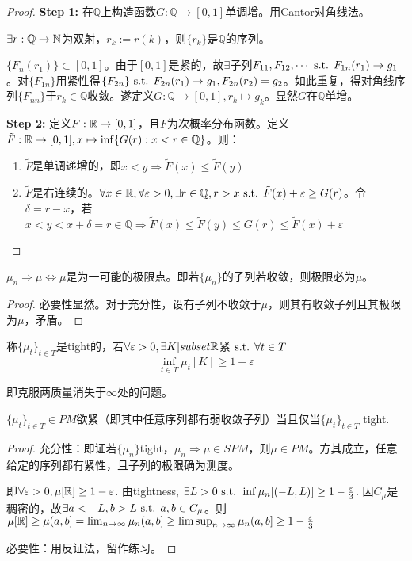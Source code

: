 \documentclass{ctexbook}
\begin{document}
\begin{proof}
  \textbf{Step 1: } 在$\mathbb{Q}$上构造函数$G:\mathbb{Q}\to [0,1]$单调增。用Cantor对角线法。

  $\exists r:\mathbb{Q}\to \mathbb{N}$为双射，$r_{k}:=r(k)$，则$\{r_{k}\}$是$\mathbb{Q}$的序列。

  $\{F_{n}(r_{1})\}\subset [0,1]$。由于$[0,1]$是紧的，故$\exists $子列$F_{11},F_{12},\cdots\text{ s.t. } F_{1n}(r_{1})\to g_{1}$。对$\{F_{1n}\}$用紧性得$\{F_{2n}\}\text{ s.t. } F_{2n}(r_{1})\to g_{1},F_{2n}(r_{2})=g_{2}$。如此重复，得对角线序列$\{F_{nn}\}$于$r_{k}\in\mathbb{Q}$收敛。遂定义$G:\mathbb{Q}\to [0,1],r_{k}\mapsto g_{k}$。显然$G$在$\mathbb{Q}$单增。

\textbf{Step 2: } 定义$F:\mathbb{R}\to[0,1]$，且$F$为次概率分布函数。定义$\tilde{F}:\mathbb{R}\to [0,1],x\mapsto \inf\{G(r):x<r\in\mathbb{Q}\}$。则：
\begin{enumerate}
\item $\tilde{F}$是单调递增的，即$x<y\Rightarrow \tilde{F}(x)\leq \tilde{F}(y)$
\item $\tilde{F}$是右连续的。$\forall x\in \mathbb{R},\forall\varepsilon>0,\exists r\in\mathbb{Q},r>x\text{ s.t. } \tilde{F}(x)+\varepsilon\geq G(r)$。令$\delta=r-x$，若$x<y<x+\delta=r\in\mathbb{Q}\Rightarrow \tilde{F}(x)\leq\tilde{F}(y)\leq G(r)\leq \tilde F(x)+\varepsilon$
\end{enumerate}
\end{proof}

\begin{Cor}
  $\mu_{n}\Rightarrow \mu\Leftrightarrow \mu$是为一可能的极限点。即若$\{\mu_{n}\}$的子列若收敛，则极限必为$\mu$。
\end{Cor}

\begin{proof}
  必要性显然。对于充分性，设有子列不收敛于$\mu$，则其有收敛子列且其极限为$\mu$，矛盾。
\end{proof}

\begin{Def}[tightness]
  称$\{\mu_{t}\}_{t\in T}$是tight的，若$\forall\varepsilon>0,\exists K]subset\mathbb{R}$紧$\text{ s.t. } \forall t\in T$
  \[\inf_{t\in T}\mu_{t}[K]\geq 1-\varepsilon\]
\end{Def}
即克服两质量消失于$\infty$处的问题。

\begin{Thm}
  $\{\mu_{t}\}_{t\in T}\in PM$欲紧（即其中任意序列都有弱收敛子列）当且仅当$\{\mu_{t}\}_{t\in T}$ tight.
\end{Thm}
\begin{proof}
  充分性：即证若$\{\mu_{n}\}$tight，$\mu_{n}\Rightarrow \mu\in SPM$，则$\mu\in PM$。方其成立，任意给定的序列都有紧性，且子列的极限确为测度。

  即$\forall\varepsilon>0,\mu[\mathbb{R}]\geq 1-\varepsilon$. 由tightness, $\exists L>0\text{ s.t. } \inf\mu_{n}[(-L,L)]\geq 1-\frac{\varepsilon}{3}$. 因$C_{\mu}$是稠密的，故$\exists a<-L,b>L\text{ s.t. } a,b\in C_{\mu}$。则$\mu[\mathbb{R}]\geq \mu(a,b]=\lim_{n\to\infty}\mu_{n}(a,b]\geq\limsup_{n\to\infty}\mu_{n}(a,b]\geq 1-\frac{\varepsilon}{3}$

  必要性：用反证法，留作练习。
\end{proof}
\end{document}
